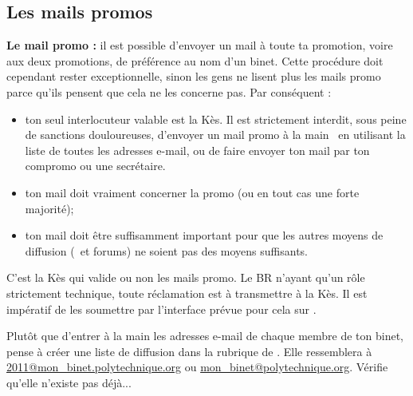 \subsection{Les mails promos}


\textbf{Le mail promo :} il est possible d'envoyer un mail \`a toute
ta promotion, voire aux deux promotions, de pr\'ef\'erence au nom d'un binet.
Cette proc\'edure doit cependant rester exceptionnelle, sinon les gens ne lisent plus les
mails promo parce qu'ils pensent que cela ne les concerne pas. Par
cons\'equent :
\begin{itemize}
  \item ton seul interlocuteur valable est la K\`es. Il est strictement interdit, sous peine de sanctions douloureuses, d'envoyer un mail promo \og \`a la main \fg~en utilisant la liste de toutes les adresses e-mail,
  ou de faire envoyer ton mail par ton compromo ou une secr\'etaire.
  \item ton mail doit vraiment concerner la promo (ou en tout cas une forte majorit\'e);
  \item ton mail doit \^etre suffisamment important pour que les autres moyens de diffusion (\fkz\ et forums) ne soient pas des moyens suffisants.
\end{itemize}
C'est la K\`es qui valide ou non les mails promo. Le BR n'ayant qu'un r\^ole strictement technique, toute r\'eclamation est \`a transmettre \`a la K\`es. Il est
imp\'eratif de les soumettre par l'interface pr\'evue pour cela sur \fkz.

Plut\^ot que d'entrer \`a la main les adresses e-mail de chaque membre de ton binet, pense \`a cr\'eer une liste de diffusion dans la rubrique  de .
Elle ressemblera \`a \url{2011@mon_binet.polytechnique.org} ou \url{mon_binet@polytechnique.org}. V\'erifie qu'elle n'existe pas d\'ej\`a...